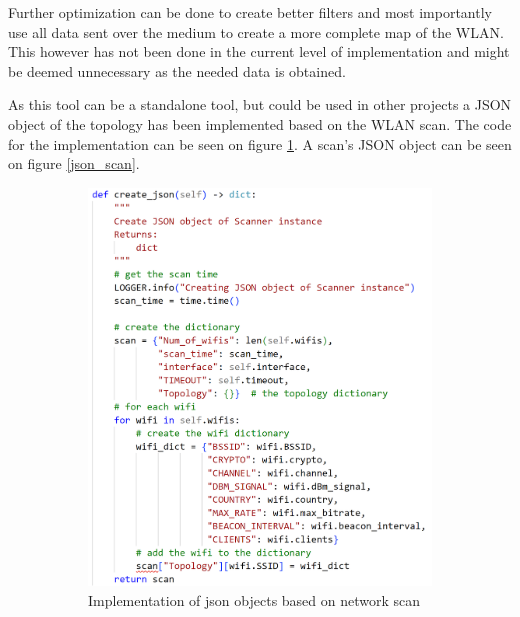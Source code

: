 Further optimization can be done to create better filters and most importantly use all data sent over the medium to create a more complete map of the WLAN. This however has not been done in the current level of implementation and might be deemed unnecessary as the needed data is obtained.

As this tool can be a standalone tool, but could be used in other projects a JSON object of the topology has been implemented based on the WLAN scan. The code for the implementation can be seen on figure \ref{create_json_code}. A scan's JSON object can be seen on figure \ref{json_scan}.

\begin{figure}[!htbp]
    \centering
     \begin{subfigure}{0.49\textwidth}
         \centering
         \includegraphics[width=\textwidth]{Latex-Files/Billeder/create_json_code.png}
         \caption{Implementation of json objects based on network scan}
         \label{create_json_code}
     \end{subfigure}
      \begin{subfigure}{0.49\textwidth}
         \centering

\end{subfigure}
\end{figure}
